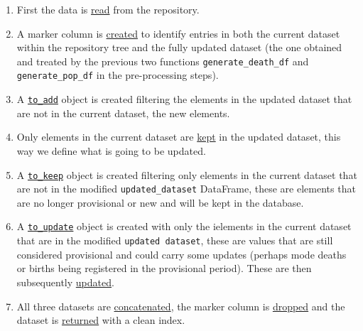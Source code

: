 \documentclass[
  a4paper]{article}
\begin{document}
\begin{enumerate}
\def\labelenumi{\arabic{enumi}.}
\item
  First the data is
  \href{https://github.com/dreth/tfm_uc3m/blob/report_ref/api/functions.py\#L454}{read}
  from the repository.
\item
  A marker column is
  \href{https://github.com/dreth/tfm_uc3m/blob/report_ref/api/functions.py\#L457-L458}{created}
  to identify entries in both the current dataset within the repository
  tree and the fully updated dataset (the one obtained and treated by
  the previous two functions \texttt{generate\_death\_df} and
  \texttt{generate\_pop\_df} in the pre-processing steps).
\item
  A
  \href{https://github.com/dreth/tfm_uc3m/blob/report_ref/api/functions.py\#L461}{\texttt{to\_add}}
  object is created filtering the elements in the updated dataset that
  are not in the current dataset, the new elements.
\item
  Only elements in the current dataset are
  \href{https://github.com/dreth/tfm_uc3m/blob/report_ref/api/functions.py\#L464}{kept}
  in the updated dataset, this way we define what is going to be
  updated.
\item
  A
  \href{https://github.com/dreth/tfm_uc3m/blob/report_ref/api/functions.py\#L467}{\texttt{to\_keep}}
  object is created filtering only elements in the current dataset that
  are not in the modified \texttt{updated\_dataset} DataFrame, these are
  elements that are no longer provisional or new and will be kept in the
  database.
\item
  A
  \href{https://github.com/dreth/tfm_uc3m/blob/report_ref/api/functions.py\#L470}{\texttt{to\_update}}
  object is created with only the ielements in the current dataset that
  are in the modified \texttt{updated\ dataset}, these are values that
  are still considered provisional and could carry some updates (perhaps
  mode deaths or births being registered in the provisional period).
  These are then subsequently
  \href{https://github.com/dreth/tfm_uc3m/blob/report_ref/api/functions.py\#L473}{updated}.
\item
  All three datasets are
  \href{https://github.com/dreth/tfm_uc3m/blob/report_ref/api/functions.py\#L482}{concatenated},
  the marker column is
  \href{https://github.com/dreth/tfm_uc3m/blob/report_ref/api/functions.py\#L485}{dropped}
  and the dataset is
  \href{https://github.com/dreth/tfm_uc3m/blob/report_ref/api/functions.py\#L488}{returned}
  with a clean index.
\end{enumerate}
\end{document}
